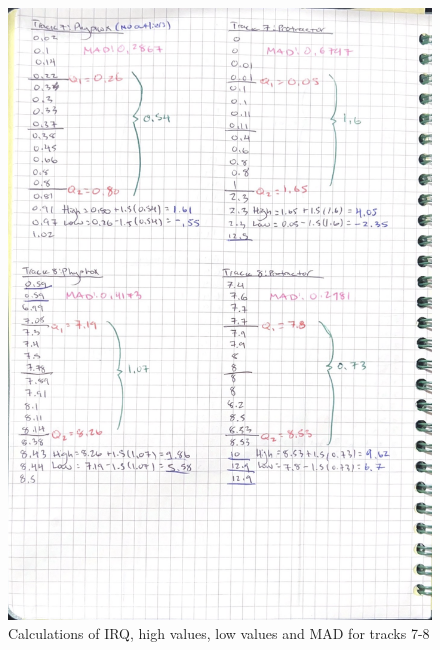\documentclass[idxtotoc,hyperref,openany]{labbook} %
\begin{document}
\begin{figure}[H] %
\begin{center}
\includegraphics[width=0.9\linewidth]{images/PhyProTrack7-8.png}
\end{center}
\caption{Calculations of IRQ, high values, low values and MAD for tracks 7-8}
\label{fig:Track7-8PhyphoxProtractor}
\end{figure}
\end{document}
